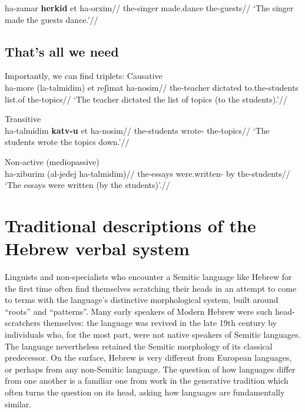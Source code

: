	\a \begingl
		\gla ha-zamar \textbf{herkid} et ha-orxim//
		\glb the-singer made.dance  the-guests//
		\glft `The singer made the guests dance.'//
	\endgl
\xe

\newpage
	\subsection{That's all we need}
\pex Importantly, we can find triplets:
	\a Causative {\thif}\\
		\begingl
		\gla ha-more  (la-talmidim) et reʃimat ha-nosim//
		\glb the-teacher dictated to.the-students  list.of the-topics//
		\glft `The teacher dictated the list of topics (to the students).'//
	\endgl
	
	\a Transitive {\tkal}\\
		\begingl
		\gla ha-talmidim \textbf{katv-u} et ha-nosim//
		\glb the-students wrote-  the-topics//
		\glft `The students wrote the topics down.'//
	\endgl
	
	\a Non-active (mediopassive) {\tnif}\\
		\begingl
		\gla ha-xiburim  (al-jedej ha-talmidim)//
		\glb the-essays were.written- by the-students//
		\glft `The essays were written (by the students)'.//
	\endgl
\xe



\section{Traditional descriptions of the Hebrew verbal system} \label{sec:tradition}
Linguists and non-specialists who encounter a Semitic language like Hebrew for the first time often find themselves scratching their heads in an attempt to come to terms with the language's distinctive morphological system, built around ``roots'' and ``patterns''. Many early speakers of Modern Hebrew were such head-scratchers themselves: the language was revived in the late 19th century by individuals who, for the most part, were not native speakers of Semitic languages. The language nevertheless retained the Semitic morphology of its classical predecessor. On the surface, Hebrew is very different from European languages, or perhaps from any non-Semitic language. The question of how languages differ from one another is a familiar one from work in the generative tradition which often turns the question on its head, asking how languages are fundamentally similar.

